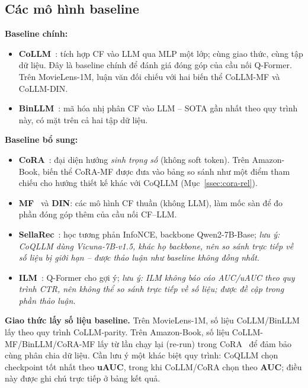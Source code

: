 \subsection{Các mô hình baseline}
\label{ssec:baseline}

\textbf{Baseline chính:}
\begin{itemize}
    \item \textbf{CoLLM}~\cite{collm2023}: tích hợp CF vào LLM qua MLP một lớp; cùng giao
    thức, cùng tập dữ liệu. Đây là baseline chính để đánh giá đóng góp của cầu nối
    Q-Former. Trên MovieLens-1M, luận văn đối chiếu với hai biến thể CoLLM-MF và CoLLM-DIN.
    \item \textbf{BinLLM}~\cite{binllm2024}: mã hóa nhị phân CF vào LLM -- SOTA gần nhất
    theo quy trình này, có mặt trên cả hai tập dữ liệu.
\end{itemize}

\textbf{Baseline bổ sung:}
\begin{itemize}
    \item \textbf{CoRA}~\cite{cora2024}: đại diện hướng \textit{sinh trọng số} (không soft
    token). Trên Amazon-Book, biến thể CoRA-MF được đưa vào bảng so sánh như một điểm tham
    chiếu cho hướng thiết kế khác với CoQLLM (Mục~\ref{ssec:cora-rel}).
    \item \textbf{MF}~\cite{bpr2009} và \textbf{DIN}: các mô hình CF thuần (không LLM),
    làm mốc sàn để đo phần đóng góp thêm của cầu nối CF--LLM.
    \item \textbf{SellaRec}~\cite{sellarec2024}: học tương phản InfoNCE, backbone
    Qwen2-7B-Base; \textit{lưu ý: CoQLLM dùng Vicuna-7B-v1.5, khác họ backbone, nên so sánh
    trực tiếp về số liệu bị giới hạn -- được thảo luận như baseline không đồng nhất}.
    \item \textbf{ILM}~\cite{ilm2024}: Q-Former cho gợi ý; \textit{lưu ý: ILM không báo
    cáo AUC/uAUC theo quy trình CTR, nên không thể so sánh trực tiếp về số liệu; được
    đề cập trong phần thảo luận}.
\end{itemize}

\textbf{Giao thức lấy số liệu baseline.} Trên MovieLens-1M, số liệu CoLLM/BinLLM lấy theo
quy trình CoLLM-parity. Trên Amazon-Book, số liệu CoLLM-MF/BinLLM/CoRA-MF lấy từ lần chạy
lại (re-run) trong CoRA~\cite{cora2024} để đảm bảo cùng phân chia dữ liệu. Cần lưu ý một
khác biệt quy trình: CoQLLM chọn checkpoint tốt nhất theo \textbf{uAUC}, trong khi
CoLLM/CoRA chọn theo \textbf{AUC}; điều này được ghi chú trực tiếp ở bảng kết quả.

